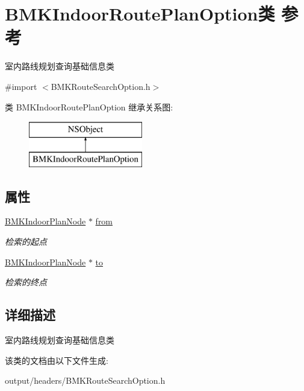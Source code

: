 \hypertarget{interface_b_m_k_indoor_route_plan_option}{}\section{B\+M\+K\+Indoor\+Route\+Plan\+Option类 参考}
\label{interface_b_m_k_indoor_route_plan_option}


室内路线规划查询基础信息类  




{\ttfamily \#import $<$B\+M\+K\+Route\+Search\+Option.\+h$>$}

类 B\+M\+K\+Indoor\+Route\+Plan\+Option 继承关系图\+:\begin{figure}[H]
\begin{center}
\leavevmode
\includegraphics[height=2.000000cm]{interface_b_m_k_indoor_route_plan_option}
\end{center}
\end{figure}
\subsection*{属性}
\begin{DoxyCompactItemize}
\item 
\hypertarget{interface_b_m_k_indoor_route_plan_option_ad21e055dd877f009a9c7572858756d8f}{}\hyperlink{interface_b_m_k_indoor_plan_node}{B\+M\+K\+Indoor\+Plan\+Node} $\ast$ \hyperlink{interface_b_m_k_indoor_route_plan_option_ad21e055dd877f009a9c7572858756d8f}{from}\label{interface_b_m_k_indoor_route_plan_option_ad21e055dd877f009a9c7572858756d8f}

\begin{DoxyCompactList}\small\item\em 检索的起点 \end{DoxyCompactList}\item 
\hypertarget{interface_b_m_k_indoor_route_plan_option_a96d88547ebf5ae2c4d023ceb1e8b5658}{}\hyperlink{interface_b_m_k_indoor_plan_node}{B\+M\+K\+Indoor\+Plan\+Node} $\ast$ \hyperlink{interface_b_m_k_indoor_route_plan_option_a96d88547ebf5ae2c4d023ceb1e8b5658}{to}\label{interface_b_m_k_indoor_route_plan_option_a96d88547ebf5ae2c4d023ceb1e8b5658}

\begin{DoxyCompactList}\small\item\em 检索的终点 \end{DoxyCompactList}\end{DoxyCompactItemize}


\subsection{详细描述}
室内路线规划查询基础信息类 

该类的文档由以下文件生成\+:\begin{DoxyCompactItemize}
\item 
output/headers/B\+M\+K\+Route\+Search\+Option.\+h\end{DoxyCompactItemize}

